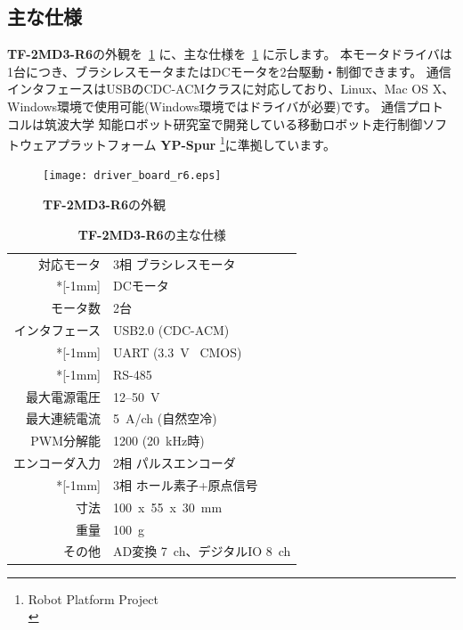 \documentclass[11pt,a4j,openany]{jbook}
\begin{document}
\newpage
\subsection{主な仕様}
\label{sec:主な仕様}

{\bf TF-2MD3-R6}の外観を\figurename~\ref{fig:driver_board_r6} に、主な仕様を\tablename~\ref{tb:tfrog_motor_driver} に示します。
本モータドライバは1台につき、ブラシレスモータまたはDCモータを2台駆動・制御できます。
通信インタフェースはUSBのCDC-ACMクラスに対応しており、Linux、Mac OS X、Windows環境で使用可能(Windows環境ではドライバが必要)です。
通信プロトコルは筑波大学 知能ロボット研究室で開発している移動ロボット走行制御ソフトウェアプラットフォーム {\bf YP-Spur} \footnote{Robot Platform Project \\ }に準拠しています。\par

\begin{figure}[H]
\centering\texttt{[image: driver\_board\_r6.eps]}
\caption{{\bf TF-2MD3-R6}の外観}
\label{fig:driver_board_r6}
\end{figure}

\begin{table}[H]
\caption{{\bf TF-2MD3-R6}の主な仕様}
\label{tb:tfrog_motor_driver}
\smallskip
\centering\begin{tabular}{rl}
\toprule
対応モータ			&	3相 ブラシレスモータ			\\*[-1mm]
					&	DCモータ						\\
モータ数			&	2台								\\
インタフェース		&	USB2.0 (CDC-ACM)				\\*[-1mm]
					&	UART (3.3~V \ CMOS)				\\*[-1mm]
					&	RS-485							\\
最大電源電圧		&	12--50~V						\\
最大連続電流		&	5~A/ch (自然空冷)				\\
PWM分解能			&	1200 (20~kHz時)					\\
エンコーダ入力		&	2相 パルスエンコーダ			\\*[-1mm]
					&	3相 ホール素子+原点信号			\\
寸法				&	100~x~55~x~30~mm				\\
重量				&	100~g							\\
その他				&	AD変換 7~ch、デジタルIO 8~ch	\\
\bottomrule
\end{tabular}
\end{table}
\end{document}
